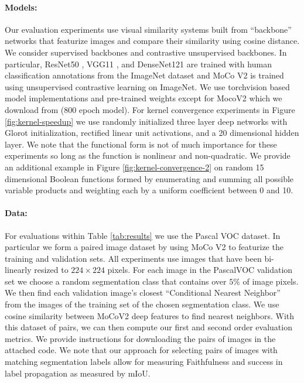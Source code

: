 \documentclass{article} %
\begin{document}
\paragraph{Models:} Our evaluation experiments use visual similarity systems built from ``backbone'' networks that featurize images and compare their similarity using cosine distance. We consider supervised backbones and contrastive unsupervised backbones. In particular, ResNet50 \citep{he2016deep}, VGG11 \citep{simonyan2014very}, and DenseNet121 \citep{huang2017densely} are trained with human classification annotations from the ImageNet dataset \citep{imagenet} and MoCo V2 is trained using unsupervised contrastive learning on ImageNet. We use torchvision \citep{torchvision} based model implementations and pre-trained weights except for MocoV2 which we download from \cite{mocogithub} (800 epoch model). For kernel convergence experiments in Figure \ref{fig:kernel-speedup} we use randomly initialized three layer deep networks with Glorot \citep{glorot2011deep} initialization, rectified linear unit activations, and a 20 dimensional hidden layer. We note that the functional form is not of much importance for these experiments so long as the function is nonlinear and non-quadratic. We provide an additional example in Figure \ref{fig:kernel-convergence-2} on random 15 dimensional Boolean functions formed by enumerating and summing all possible variable products and weighting each by a uniform coefficient between 0 and 10.

\paragraph{Data:} For evaluations within Table \ref{tab:results} we use the Pascal VOC \citep{Everingham10} dataset. In particular we form a paired image dataset by using MoCo V2 to featurize the training and validation sets. All experiments use images that have been bi-linearly resized to $224 \times 224$ pixels. For each image in the PascalVOC validation set we choose a random segmentation class that contains over $5\%$ of image pixels. We then find each validation image's closest ``Conditional Nearest Neighbor'' \citep{hamilton2020conditional} from the images of the training set of the chosen segmentation class. We use cosine similarity between MoCoV2 deep features to find nearest neighbors. With this dataset of pairs, we can then compute our first and second order evaluation metrics. We provide instructions for downloading the pairs of images in the attached code. We note that our approach for selecting pairs of images with matching segmentation labels allow for measuring Faithfulness and success in label propagation as measured by mIoU.  
\end{document}
